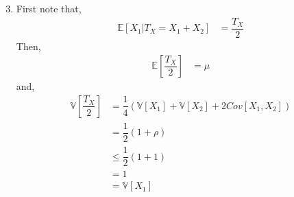 \documentclass{article}
\begin{document}
\begin{enumerate}
\setcounter{enumii}{2}
\item First note that,
\begin{align*}
\mathbb{E}\left[X_{1} | T_{X} = X_{1} + X_{2}\right] &= \dfrac{T_{X}}{2}
\end{align*}
Then,
\begin{align*}
\mathbb{E}\left[\dfrac{T_{X}}{2}\right] &= \mu
\end{align*}
and,
\begin{align*}
\mathbb{V}\left[\dfrac{T_{X}}{2}\right] &= \dfrac{1}{4} \left(\mathbb{V}\left[X_{1}\right] + \mathbb{V}\left[X_{2}\right] + 2 Cov\left[X_{1}, X_{2}\right]\right)
\\ &= \dfrac{1}{2} \left(1 + \rho\right)
\\ &\leq  \dfrac{1}{2} \left(1 + 1\right)
\\ &= 1
\\ &= \mathbb{V}\left[X_{1}\right]
\end{align*}
\end{enumerate}
\end{document}
